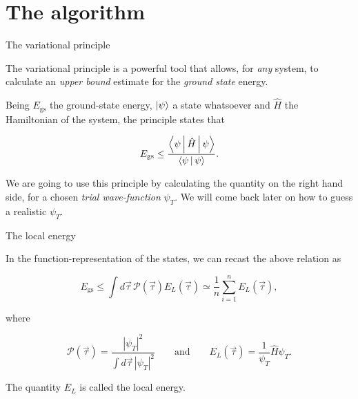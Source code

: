 \documentclass[10pt, compress, usetitleprogressbar, protectframetitle]{beamer}
\begin{document}
\section{The algorithm}

\begin{frame}{The variational principle}
	
	The \alert{variational principle} is a powerful tool that allows, for \emph{any} system, to calculate an \emph{upper bound} estimate for the \emph{ground state} energy.
	
	Being $E_{\text{gs}}$ the ground-state energy, $\Ket{\psi}$ a state whatsoever and $\hat{H}$ the Hamiltonian of the system, the principle states that
	
	\begin{equation}
		E_{\text{gs}} \leq \frac{\Braket{\psi|\hat{H}|\psi}}{\Braket{\psi|\psi}}.
	\end{equation}
	
	We are going to use this principle by calculating the quantity on the right hand side, for a chosen \emph{trial wave-function} $\psi_T$. We will come back later on how to guess a realistic $\psi_T$.
	
\end{frame}

\begin{frame}{The local energy}
	
	In the function-representation of the states, we can recast the above relation as
	
	\begin{equation}
		E_{\text{gs}}
		\leq \int d\vec{\tau}\,\mathcal{P}(\vec{\tau})E_L(\vec{\tau})
		\simeq \frac{1}{n}\sum_{i=1}^{n}E_L(\vec{\tau}),
	\end{equation}
	
	where
	
	\begin{equation}
		\mathcal{P}(\vec{\tau}) = \frac{|\psi_T|^2}{\int d\vec{\tau} \, |\psi_T|^2}
		\qquad
		\text{and}
		\qquad
		E_L(\vec{\tau}) = \frac{1}{\psi_T} \hat{H} \psi_T.
	\end{equation}
	
	The quantity $E_L$ is called the \alert{local energy}.
	

\end{frame}
\end{document}
